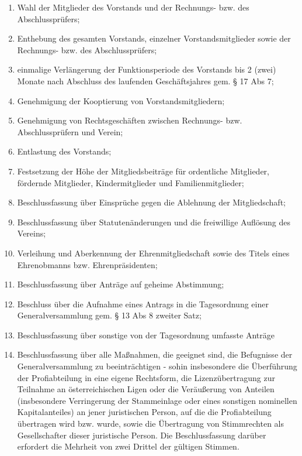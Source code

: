 \documentclass[11pt,a4paper]{article}
\begin{document}
\begin{enumerate}[label=\alph*)]
\item
Wahl der Mitglieder des Vorstands und der Rechnungs- bzw. des Abschlussprüfers;
\item
Enthebung des gesamten Vorstands, einzelner Vorstandsmitglieder sowie der Rechnungs- bzw. des Abschlussprüfers;
\item
einmalige Verlängerung der Funktionsperiode des Vorstands bis 2 (zwei) Monate nach Abschluss des laufenden Geschäftsjahres gem. § 17 Abs 7;
\item
Genehmigung der Kooptierung von Vorstandsmitgliedern;
\item
Genehmigung von Rechtsgeschäften zwischen Rechnungs- bzw. Abschlussprüfern und Verein;
\item
Entlastung des Vorstands;
\item
Festsetzung der Höhe der Mitgliedsbeiträge für ordentliche Mitglieder, fördernde Mitglieder, Kindermitglieder und Familienmitglieder;
\item
Beschlussfassung über Einsprüche gegen die Ablehnung der Mitgliedschaft;
\item
Beschlussfassung über Statutenänderungen und die freiwillige Auflösung des Vereins;
\item
Verleihung und Aberkennung der Ehrenmitgliedschaft sowie des Titels eines Ehrenobmanns bzw. Ehrenpräsidenten;
\item
Beschlussfassung über Anträge auf geheime Abstimmung;
\item
Beschluss über die Aufnahme eines Antrags in die Tagesordnung einer Generalversammlung gem. § 13 Abs 8 zweiter Satz;
\item
Beschlussfassung über sonstige von der Tagesordnung umfasste Anträge
\item
Beschlussfassung über alle Maßnahmen, die geeignet sind, die Befugnisse der Generalversammlung zu beeinträchtigen - sohin insbesondere die Überführung der Profiabteilung in eine eigene Rechtsform, die Lizenzübertragung zur Teilnahme an österreichischen Ligen oder die Veräußerung von Anteilen (insbesondere Verringerung der Stammeinlage oder eines sonstigen nominellen Kapitalanteiles) an jener juristischen Person, auf die die Profiabteilung übertragen wird bzw. wurde, sowie die Übertragung von Stimmrechten als Gesellschafter dieser juristische Person.
Die Beschlussfassung darüber erfordert die Mehrheit von zwei Drittel der gültigen Stimmen.
\end{enumerate}
\end{document}
